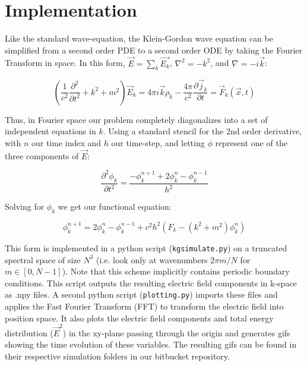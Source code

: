 \documentclass{article}
\begin{document}
	\section{Implementation}
	
	Like the standard wave-equation, the Klein-Gordon wave equation can be simplified from a second order PDE to a second order ODE by taking the Fourier Transform in space. In this form, $\vec{E} = \sum_{k}\vec{E_k}$, $\nabla^2 = -k^2$, and $\nabla = -i\vec{k}$:
	
	\begin{equation}
		\left(\frac{1}{c^2}\frac{\partial^2}{\partial t^2} + k^2 + m^2\right)\vec{E}_k = 4\pi i \vec{k} \rho_k - \frac{4\pi}{c^2}\frac{\partial\vec{j}_k}{\partial t} = \vec{F}_k(\vec{x},t)
	\end{equation}
	
	Thus, in Fourier space our problem completely diagonalizes into a set of independent equations in $k$.
	Using a standard stencil for the 2nd order derivative, with $n$ our time index and $h$ our time-step, and letting $\phi$ represent one of the three components of $\vec{E}$:
	
	\begin{equation}
		\frac{\partial^2 \phi_k}{\partial t^2} = \frac{-\phi_k^{n+1} + 2\phi_k^{n} - \phi_k^{n-1}}{h^2}
	\end{equation}
	
	Solving for $\phi_k$ we get our functional equation:
	
	\begin{equation}\boxed{
		\phi_k^{n+1} = 2\phi_k^n - \phi_k^{n-1} + c^2h^2(F_k - (k^2+m^2)\phi_k^n)}
	\end{equation}
	
	This form is implemented in a python script (\verb|kgsimulate.py|) on a truncated spectral space of size $N^3$ (i.e. look only at wavenumbers $2\pi m/N$ for $m \in [0,N-1]$). Note that this scheme implicitly contains periodic boundary conditions. This script outputs the resulting electric field components in k-space as .npy files. A second python script (\verb|plotting.py|) imports these files and applies the Fast Fourier Transform (FFT) to transform the electric field into position space. It also plots the electric field components and total energy distribution ($\vec{E}^2$) in the xy-plane passing through the origin and generates gifs showing the time evolution of these variables. The resulting gifs can be found in their respective simulation folders in our bitbucket repository.
	
\end{document}
